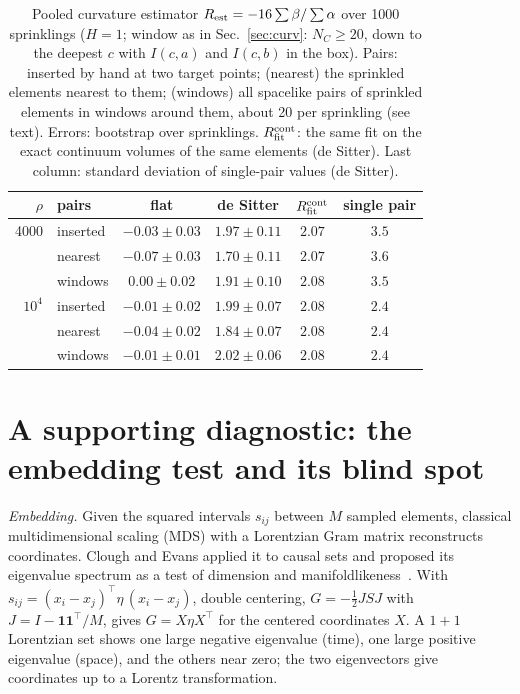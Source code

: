 \documentclass[prd,twocolumn,superscriptaddress,nofootinbib,amsmath,amssymb,floatfix]{revtex4-2}
\begin{document}
\begin{table}[t]
\caption{Pooled curvature estimator $R_{\rm est}=-16\sum\beta/\sum\alpha$ over 1000 sprinklings ($H=1$; window as in Sec.~\ref{sec:curv}: $N_C\geq20$, down to the deepest $c$ with $I(c,a)$ and $I(c,b)$ in the box). Pairs: inserted by hand at two target points; (nearest) the sprinkled elements nearest to them; (windows) all spacelike pairs of sprinkled elements in windows around them, about 20 per sprinkling (see text). Errors: bootstrap over sprinklings. $R_{\rm fit}^{\rm cont}$: the same fit on the exact continuum volumes of the same elements (de Sitter). Last column: standard deviation of single-pair values (de Sitter).}
\label{tab:rest}
\begin{ruledtabular}
\begin{tabular}{rlcccc}
$\rho$ & pairs & flat & de Sitter & $R_{\rm fit}^{\rm cont}$ & single pair\\
\hline
4000 & inserted & $-0.03\pm0.03$ & $1.97\pm0.11$ & $2.07$ & $3.5$\\
 & nearest & $-0.07\pm0.03$ & $1.70\pm0.11$ & $2.07$ & $3.6$\\
 & windows & $0.00\pm0.02$ & $1.91\pm0.10$ & $2.08$ & $3.5$\\
$10^4$ & inserted & $-0.01\pm0.02$ & $1.99\pm0.07$ & $2.08$ & $2.4$\\
 & nearest & $-0.04\pm0.02$ & $1.84\pm0.07$ & $2.08$ & $2.4$\\
 & windows & $-0.01\pm0.01$ & $2.02\pm0.06$ & $2.08$ & $2.4$\\
\end{tabular}
\end{ruledtabular}
\end{table}

\section{A supporting diagnostic: the embedding test and its blind spot}\label{sec:embed}
\emph{Embedding.} Given the squared intervals $s_{ij}$ between $M$ sampled elements, classical multidimensional scaling (MDS) with a Lorentzian Gram matrix reconstructs coordinates. Clough and Evans applied it to causal sets and proposed its eigenvalue spectrum as a test of dimension and manifoldlikeness~\cite{CloughEvans16,Clough17}. With $s_{ij}=(x_i-x_j)^{\top}\eta\,(x_i-x_j)$, double centering, $G=-\tfrac12JSJ$ with $J=I-\mathbf1\mathbf1^{\top}/M$, gives $G=X\eta X^{\top}$ for the centered coordinates $X$. A $1+1$ Lorentzian set shows one large negative eigenvalue (time), one large positive eigenvalue (space), and the others near zero; the two eigenvectors give coordinates up to a Lorentz transformation.
\end{document}
